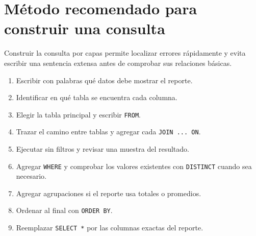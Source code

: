 \documentclass[10pt,letterpaper]{article}
\begin{document}
\section{Método recomendado para construir una consulta}

Construir la consulta por capas permite localizar errores rápidamente y evita
escribir una sentencia extensa antes de comprobar sus relaciones básicas.

\begin{enumerate}
  \item Escribir con palabras qué datos debe mostrar el reporte.
  \item Identificar en qué tabla se encuentra cada columna.
  \item Elegir la tabla principal y escribir \lstinline|FROM|.
  \item Trazar el camino entre tablas y agregar cada \lstinline|JOIN ... ON|.
  \item Ejecutar sin filtros y revisar una muestra del resultado.
  \item Agregar \lstinline|WHERE| y comprobar los valores existentes con
        \lstinline|DISTINCT| cuando sea necesario.
  \item Agregar agrupaciones si el reporte usa totales o promedios.
  \item Ordenar al final con \lstinline|ORDER BY|.
  \item Reemplazar \lstinline|SELECT *| por las columnas exactas del reporte.
\end{enumerate}
\end{document}
